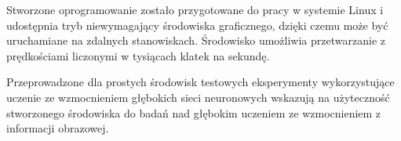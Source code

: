 Stworzone oprogramowanie zostało przygotowane do pracy w systemie Linux i udostępnia tryb niewymagający środowiska graficznego, dzięki czemu może być uruchamiane na zdalnych stanowiskach.
Środowisko umożliwia przetwarzanie z prędkościami liczonymi w tysiącach klatek na sekundę.

Przeprowadzone dla prostych środowisk testowych eksperymenty wykorzystujące uczenie ze wzmocnieniem głębokich sieci neuronowych wskazują na użyteczność stworzonego środowiska do badań nad głębokim uczeniem ze wzmocnieniem z informacji obrazowej.
	
